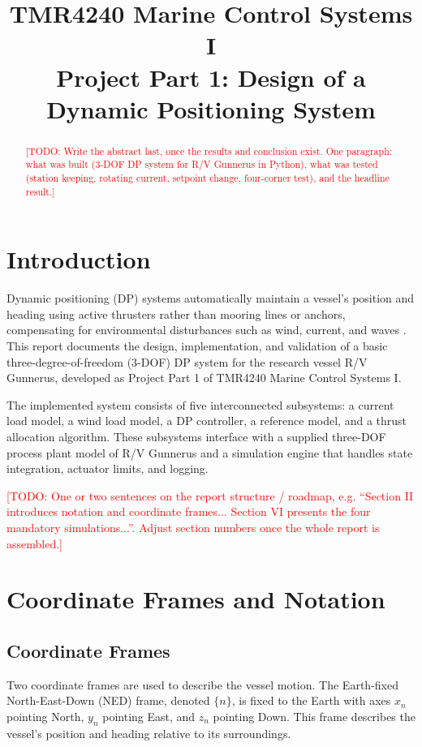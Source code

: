 \documentclass[10pt,conference]{IEEEtran}
\title{TMR4240 Marine Control Systems I\\
Project Part 1: Design of a Dynamic Positioning System}
\author{\IEEEauthorblockN{Group 7}
\IEEEauthorblockA{Department of Marine Technology, NTNU\\
Ivan Mordovets and Bastien Moreaux}}
\newcommand{\todo}[1]{\textcolor{red}{[TODO: #1]}}
\begin{document}
\maketitle

\begin{abstract}
\todo{Write the abstract last, once the results and conclusion exist.
One paragraph: what was built (3-DOF DP system for R/V Gunnerus in
Python), what was tested (station keeping, rotating current, setpoint
change, four-corner test), and the headline result.}
\end{abstract}

\section{Introduction}

Dynamic positioning (DP) systems automatically maintain a vessel's
position and heading using active thrusters rather than mooring lines
or anchors, compensating for environmental disturbances such as wind,
current, and waves \cite{fossen2011}. This report documents the design,
implementation, and validation of a basic three-degree-of-freedom (3-DOF)
DP system for the research vessel R/V Gunnerus, developed as Project
Part 1 of TMR4240 Marine Control Systems I.

The implemented system consists of five interconnected subsystems: a
current load model, a wind load model, a DP controller, a reference
model, and a thrust allocation algorithm. These subsystems interface
with a supplied three-DOF process plant model of R/V Gunnerus and a
simulation engine that handles state integration, actuator limits, and
logging.

\todo{One or two sentences on the report structure / roadmap, e.g.
``Section II introduces notation and coordinate frames... Section VI
presents the four mandatory simulations...''. Adjust section numbers
once the whole report is assembled.}

\section{Coordinate Frames and Notation}
\label{sec:frames}

\subsection{Coordinate Frames}

Two coordinate frames are used to describe the vessel motion. The
Earth-fixed North-East-Down (NED) frame, denoted $\{n\}$, is fixed to
the Earth with axes $x_n$ pointing North, $y_n$ pointing East, and
$z_n$ pointing Down. This frame describes the vessel's position and
heading relative to its surroundings.
\end{document}
